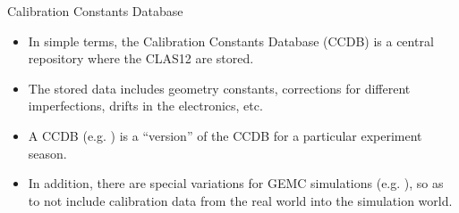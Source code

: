 \begin{frame}{Calibration Constants Database}
    \label{20.01::ccdb}
    \begin{itemize}
        \item
        \vspace{12pt}
        In simple terms, the Calibration Constants Database (CCDB) is a central repository where the CLAS12  are stored.
        \item
            The stored data includes geometry constants, corrections for different imperfections, drifts in the electronics, etc.

        \vspace{12pt}
        \item
            A CCDB  (e.g. ) is a ``version'' of the CCDB for a particular experiment season.

        \vspace{12pt}
        \item
            In addition, there are special variations for GEMC simulations (e.g. ), so as to not include calibration data from the real world into the simulation world.
    \end{itemize}

\end{frame}
